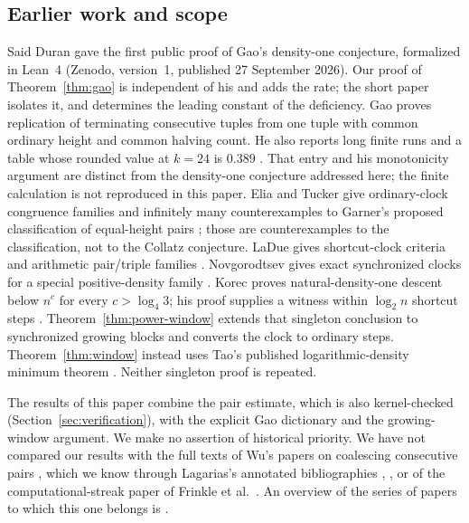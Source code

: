\documentclass[11pt]{amsart}
\theoremstyle{definition}
\theoremstyle{remark}
\begin{document}
\subsection*{Earlier work and scope}
Said Duran gave the first public proof of Gao's density-one conjecture, formalized in Lean~4 \cite[Theorems~A and~B]{Duran2026} (Zenodo, version~1, published 27 September 2026). Our proof of Theorem~\ref{thm:gao} is independent of his and adds the rate; the short paper \cite{GaoDensityOne} isolates it, and \cite[Theorem~A]{Rates} determines the leading constant of the deficiency.
Gao proves replication of terminating consecutive tuples from one tuple with common ordinary height and common halving count. He also reports long finite runs and a table whose rounded value at $k=24$ is $0.389$ \cite{Gao1993}. That entry and his monotonicity argument are distinct from the density-one conjecture addressed here; the finite calculation is not reproduced in this paper.
Elia and Tucker give ordinary-clock congruence families and infinitely many counterexamples to Garner's proposed classification of equal-height pairs \cite{EliaTucker2015}; those are counterexamples to the classification, not to the Collatz conjecture. LaDue gives shortcut-clock criteria and arithmetic pair/triple families \cite{LaDue2017}. Novgorodtsev gives exact synchronized clocks for a special positive-density family \cite{Novgorodtsev2026b}.
Korec proves natural-density-one descent below $n^c$ for every $c>\log_4 3$; his proof supplies a witness within $\log_2 n$ shortcut steps \cite[Theorem~1 and pp.~86--88]{Korec1994}. Theorem~\ref{thm:power-window} extends that singleton conclusion to synchronized growing blocks and converts the clock to ordinary steps. Theorem~\ref{thm:window} instead uses Tao's published logarithmic-density minimum theorem \cite[Theorem~1.3]{Tao2022}. Neither singleton proof is repeated.

The results of this paper combine the pair estimate, which is also kernel-checked (Section~\ref{sec:verification}), with the explicit Gao dictionary and the growing-window argument. We make no assertion of historical priority. We have not compared our results with the full texts of Wu's papers on coalescing consecutive pairs \cite{Wu1995,WuHuang2001}, which we know through Lagarias's annotated bibliographies \cite[entry~190]{Lagarias2011}, \cite[entry~125]{Lagarias2012}, or of the computational-streak paper of Frinkle et al.\ \cite{FrinkleEtAl2025}. An overview of the series of papers to which this one belongs is \cite{Umbrella}.
\end{document}
